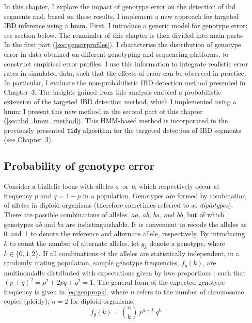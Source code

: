 In this chapter, I explore the impact of genotype error on the detection of \gls{ibd} segments and, based on these results, I implement a new approach for targeted IBD inference using a \gls{hmm}.
First, I introduce a generic model for genotype error; see section below.
The remainder of this chapter is then divided into  main parts.
In the first part (\cref{sec:generrprofiles}), I characterise the distribution of genotype error in data obtained on different genotyping and sequencing platforms, to construct empirical error profiles.
I use this information to integrate realistic error rates in simulated data, such that the effects of error can be observed in practice.
In particular, I evaluate the non-probabilistic IBD detection method presented in Chapter~3.
The insights gained from this analysis enabled a probabilistic extension of the targeted IBD detection method, which I implemented using a \gls{hmm}; I present this new method in the second part of this chapter (\cref{sec:ibd_hmm_method}).
This HMM-based method is incorporated in the previously presented \texttt{tidy} algorithm for the targeted detection of IBD segments (see Chapter~3).




%
\subsection{Probability of genotype error}
\label{sub:probgenerr}
%

Consider a biallelic locus with alleles $a$~or~$b$, which respectively occur at frequency $p$ and ${q = 1 - p}$ in a population.
Genotypes are formed by combination of  alleles in diploid organisms (therefore sometimes referred to as \emph{diplotypes}).
There are  possible combinations of alleles, \ie $aa$, $ab$, $ba$, and $bb$, but of which genotypes $ab$ and $ba$ are indistinguishable.
It is convenient to recode the  alleles as 0~and~1 to denote the reference and alternate allele, respectively.
By introducing $k$ to count the number of alternate alleles, let $g_{k}$ denote a genotype, where ${k \in \lbrace 0, 1, 2 \rbrace}$.
If all combinations of the  alleles are statistically independent, \eg in a randomly mating population, sample genotype frequencies, ${f_{g}(k)}$, are multinomially distributed with expectations given by \gls{hwe} proportions \citep{Hardy:1908wx, Weinberg:1908tr}; \ie such that ${(p+q)^2 = p^2 + 2pq + q^2 = 1}$.
The general form of the expected genotype frequency is given in \cref{eq:genpropk}, where $n$ refers to the number of chromosome copies (ploidy); \eg ${n = 2}$ for diploid organisms.
\begin{equation}\label{eq:genpropk}
	f_{g}(k) = {{n}\choose{k}}~p^{n-k}~q^{k}
\end{equation}

